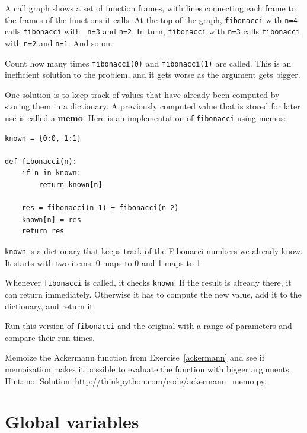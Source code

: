 \documentclass[10pt]{book}
\begin{document}
\begin{CJK}{UTF8}{gbsn}
A call graph shows a set of function frames, with lines connecting each
frame to the frames of the functions it calls.  At the top of the
graph, {\tt fibonacci} with {\tt n=4} calls {\tt fibonacci} with {\tt
n=3} and {\tt n=2}.  In turn, {\tt fibonacci} with {\tt n=3} calls
{\tt fibonacci} with {\tt n=2} and {\tt n=1}.  And so on.

Count how many times {\tt fibonacci(0)} and {\tt fibonacci(1)} are
called.  This is an inefficient solution to the problem, and it gets
worse as the argument gets bigger.

One solution is to keep track of values that have already been
computed by storing them in a dictionary.  A previously computed value
that is stored for later use is called a {\bf memo}.  Here is an
implementation of {\tt fibonacci} using memos:

\begin{verbatim}
known = {0:0, 1:1}

def fibonacci(n):
    if n in known:
        return known[n]

    res = fibonacci(n-1) + fibonacci(n-2)
    known[n] = res
    return res
\end{verbatim}
%
{\tt known} is a dictionary that keeps track of the Fibonacci
numbers we already know.  It starts with
two items: 0 maps to 0 and 1 maps to 1.

Whenever {\tt fibonacci} is called, it checks {\tt known}.
If the result is already there, it can return
immediately.  Otherwise it has to 
compute the new value, add it to the dictionary, and return it.

\begin{exercise}

Run this version of {\tt fibonacci} and the original with
a range of parameters and compare their run times.

\end{exercise}

\begin{exercise}

Memoize the Ackermann function from Exercise~\ref{ackermann} and see if
memoization makes it possible to evaluate the function with bigger
arguments.  Hint: no.
Solution: \url{http://thinkpython.com/code/ackermann_memo.py}.

\end{exercise}


\section{Global variables}


\end{CJK}
\end{document}
